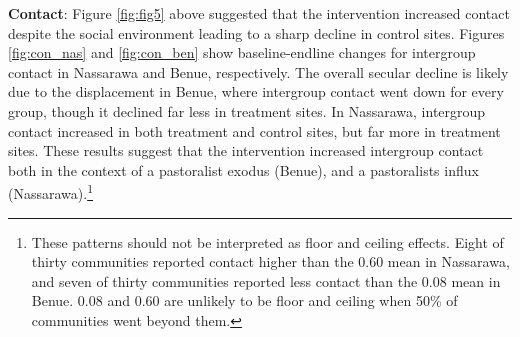 \documentclass[11pt]{article}
\begin{document}
\textbf{Contact}: Figure \ref{fig:fig5} above suggested that the
intervention increased contact despite the social environment leading to
a sharp decline in control sites. Figures \ref{fig:con_nas} and
\ref{fig:con_ben} show baseline-endline changes for intergroup contact
in Nassarawa and Benue, respectively. The overall secular decline is
likely due to the displacement in Benue, where intergroup contact went
down for every group, though it declined far less in treatment sites. In
Nassarawa, intergroup contact increased in both treatment and control
sites, but far more in treatment sites. These results suggest that the
intervention increased intergroup contact both in the context of a
pastoralist exodus (Benue), and a pastoralists influx
(Nassarawa).\footnote{These patterns should not be interpreted as floor
  and ceiling effects. Eight of thirty communities reported contact
  higher than the 0.60 mean in Nassarawa, and seven of thirty
  communities reported less contact than the 0.08 mean in Benue. 0.08
  and 0.60 are unlikely to be floor and ceiling when 50\% of communities
  went beyond them.}
\end{document}

